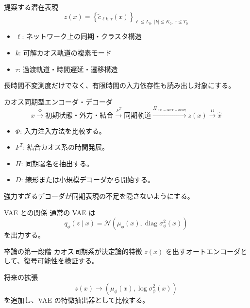 \documentclass[aspectratio=169,11pt]{beamer}
\begin{document}
\begin{frame}{提案する潜在表現}
  \[
    \boxed{
      z(x)=
      \left\{
        \widetilde c_{\ell k,\tau}(x)
      \right\}_{\ell\le L_0,\ |k|\le K_0,\ \tau\le T_0}
    }
  \]
  \begin{itemize}
    \item \(\ell\): ネットワーク上の同期・クラスタ構造
    \item \(k\): 可解カオス軌道の複素モード
    \item \(\tau\): 過渡軌道・時間遅延・遷移構造
  \end{itemize}
  \vfill
  長時間不変測度だけでなく、有限時間の入力依存性も読み出し対象にする。
\end{frame}

\begin{frame}{カオス同期型エンコーダ・デコーダ}
  \[
    x
    \xrightarrow{\Phi}
    \text{初期状態・外力・結合}
    \xrightarrow{F^T}
    \text{同期軌道}
    \xrightarrow{\Pi_{\mathrm{TM-GFT-delay}}}
    z(x)
    \xrightarrow{D}
    \widehat x
  \]
  \begin{itemize}
    \item \(\Phi\): 入力注入方法を比較する。
    \item \(F^T\): 結合カオス系の時間発展。
    \item \(\Pi\): 同期署名を抽出する。
    \item \(D\): 線形または小規模デコーダから開始する。
  \end{itemize}
  強力すぎるデコーダが同期表現の不足を隠さないようにする。
\end{frame}

\begin{frame}{VAE との関係}
  通常の VAE は
  \[
    q_\phi(z\mid x)=
    \mathcal N\!\left(
      \mu_\phi(x),\operatorname{diag}\sigma_\phi^2(x)
    \right)
  \]
  を出力する。
  \begin{block}{卒論の第一段階}
    カオス同期系が決定論的特徴 \(z(x)\) を出すオートエンコーダとして、復号可能性を検証する。
  \end{block}
  \begin{block}{将来の拡張}
    \[
      z(x)\rightarrow
      (\mu_\phi(x),\log\sigma_\phi^2(x))
    \]
    を追加し、VAE の特徴抽出器として比較する。
  \end{block}
\end{frame}
\end{document}
